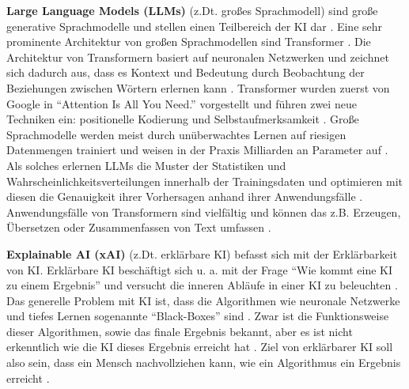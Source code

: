 
\textbf{Large Language Models (LLMs)} (z.Dt. großes Sprachmodell) sind große generative Sprachmodelle und stellen einen Teilbereich der KI dar \cite{nvidia-llm}.
Eine sehr prominente Architektur von großen Sprachmodellen sind Transformer \cite{nvidia-llm}.
Die Architektur von Transformern basiert auf neuronalen Netzwerken und zeichnet sich dadurch aus, dass es Kontext und Bedeutung durch Beobachtung der Beziehungen zwischen Wörtern erlernen kann \cite{nvidia-llm}.
Transformer wurden zuerst von Google in \enquote{Attention Is All You Need.} \cite{google-attention} vorgestellt und führen zwei neue Techniken ein: positionelle Kodierung und Selbstaufmerksamkeit \cite{nvidia-llm}.
Große Sprachmodelle werden meist durch unüberwachtes Lernen auf riesigen Datenmengen trainiert und weisen in der Praxis Milliarden an Parameter auf \cite{nvidia-llm}.
Als solches erlernen LLMs die Muster der Statistiken und Wahrscheinlichkeitsverteilungen innerhalb der Trainingsdaten und optimieren mit diesen die Genauigkeit ihrer Vorhersagen anhand ihrer Anwendungsfälle \cite{towards-data-science-icl}.
Anwendungsfälle von Transformern sind vielfältig und können das z.B. Erzeugen, Übersetzen oder Zusammenfassen von Text umfassen \cite{nvidia-llm}.

\textbf{Explainable AI (xAI)} (z.Dt. erklärbare KI) befasst sich mit der Erklärbarkeit von KI.
Erklärbare KI beschäftigt sich u. a. mit der Frage \enquote{Wie kommt eine KI zu einem Ergebnis} und versucht die inneren Abläufe in einer KI zu beleuchten \cite{explainable-ai-kobold}.
Das generelle Problem mit KI ist, dass die Algorithmen wie neuronale Netzwerke und tiefes Lernen sogenannte \enquote{Black-Boxes} sind \cite{explainable-ai-kobold}.
Zwar ist die Funktionsweise dieser Algorithmen, sowie das finale Ergebnis bekannt, aber es ist nicht erkenntlich wie die KI dieses Ergebnis erreicht hat \cite{explainable-ai-kobold}.
Ziel von erklärbarer KI soll also sein, dass ein Mensch nachvollziehen kann, wie ein Algorithmus ein Ergebnis erreicht \cite{explainable-ai-kobold}.

